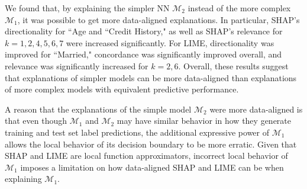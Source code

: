 \documentclass[mnsc,blindrev]{informs3}
\begin{document}
            We found that, by explaining the simpler NN $\mathcal{M}_2$ instead of the more complex $\mathcal{M}_1$, it was possible to get more data-aligned explanations. %
            In particular, SHAP's directionality for ``Age and ``Credit History," as well as SHAP's relevance for $k=1,2,4,5,6,7$ were increased significantly. 
            For LIME, directionality was improved for ``Married," concordance was significantly improved overall, and relevance was significantly increased for $k=2,6$. Overall, these results suggest that explanations of simpler models can be more data-aligned than explanations of more complex models with equivalent predictive performance. 
            
            A reason that the explanations of the simple model $\mathcal{M}_2$ were more data-aligned is that even though $\mathcal{M}_1$ and $\mathcal{M}_2$ may have similar behavior in how they generate training and test set label predictions, the additional expressive power of $\mathcal{M}_1$ allows the local behavior of its decision boundary to be more erratic. Given that SHAP and LIME are local function approximators, incorrect local behavior of $\mathcal{M}_1$ imposes a limitation on how data-aligned SHAP and LIME can be when explaining $\mathcal{M}_1$. 
\end{document}
